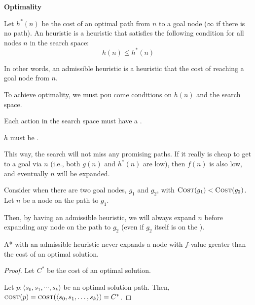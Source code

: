 \begin{listu}
    \item \textbf{Optimality}
    
    \begin{definition}[Asmissibility]\label{def:asmissibility}
        Let $h^*(n)$ be the cost of an optimal path from $n$ to a goal node ($\infty$ if there is no path). An  heuristic is a heuristic that satisfies the following condition for all nodes $n$ in the search space: \[
            h(n) \le h^*(n)
        \]
    \end{definition}

    In other words, an admissible heuristic is a heuristic that  the cost of reaching a goal node from $n$.

    To achieve optimality, we must pou come conditions on $h(n)$ and the search space.
    \begin{listu}
        \item Each action in the search space must have a .
        \item $h$ must be .
    \end{listu}

    This way, the search will not miss any promising paths. If it really is cheap to get to a goal via $n$ (i.e., both $g(n)$ and $h^*(n)$ are low), then $f(n)$ is also low, and eventually $n$ will be expanded. 

    \begin{example}
        Consider when there are two goal nodes, $g_1$ and $g_2$, with $\textsc{Cost}(g_1) < \textsc{Cost}(g_2)$. Let $n$ be a node on the path to $g_1$. 

        Then, by having an admissible heuristic, we will always expand $n$ before expanding any node on the path to $g_2$ (even if $g_2$ itself is on the \Frontier).
    \end{example}

    \begin{proposition}\label{prop:optimal-cost}
        A* with an admissible heuristic never expands a node with $f$-value greater than the cost of an optimal solution. 
    \end{proposition}

    \begin{proof}
        Let $C^*$ be the cost of an optimal solution.

        Let $p: \langle s_0, s_1, \cdots, s_k \rangle$ be an optimal solution path. Then, $\textsc{cost}(p) = \textsc{cost}( \langle s_0, s_1, \dots, s_k \rangle) = C^*$.


\end{proof}
\end{listu}

